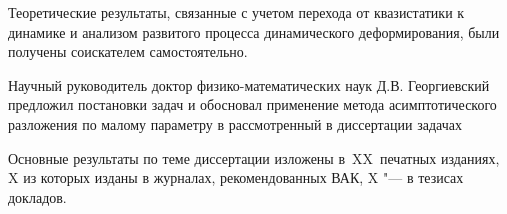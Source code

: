 {\contribution} Теоретические результаты, связанные с учетом перехода от квазистатики к динамике и анализом развитого процесса динамического деформирования, были получены соискателем самостоятельно.

Научный руководитель доктор физико-математических наук Д.В. Георгиевский предложил постановки задач и обосновал применение метода асимптотического разложения по малому параметру в рассмотренный в диссертации задачах

{%
    {\publications} Основные результаты по теме диссертации изложены
    в~XX~печатных изданиях,
    X из которых изданы в журналах, рекомендованных ВАК,
    X "--- в тезисах докладов.
}%
